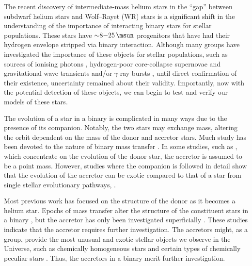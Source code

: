 The recent discovery of intermediate-mass helium stars in the ``gap'' between subdwarf helium stars and Wolf--Rayet (WR) stars \citep{Drout:2023, Gotberg:2023} is a significant shift in the understanding of the importance of interacting binary stars for stellar populations. These stars have ${\sim}\SI[parse-numbers=false]{8{-}25}{\msun}$ progenitors that have had their hydrogen envelope stripped via binary interaction. Although many groups have investigated the importance of these objects for stellar populations, such as sources of ionising photons \citep[e.g.][]{Stanway:2016, Gotberg:2017, Xiao:2018}, hydrogen-poor core-collapse supernovae \citep[e.g.][]{deDonder:1998, Smith:2011, Eldridge:2013, Eldridge:2016, Laplace:2021} and gravitational wave transients and/or $\gamma$-ray bursts \citep[e.g.][]{Eldridge:2011, Qin:2018, Bavera:2020, Fuller:2022, Stevance:2023}, until direct confirmation of their existence, uncertainty remained about their validity. Importantly, now with the potential detection of these objects, we can begin to test and verify our models of these stars.

The evolution of a star in a binary is complicated in many ways due to the presence of its companion. Notably, the two stars may exchange mass, altering the orbit dependent on the mass of the donor and accretor stars. Much study has been devoted to the nature of binary mass transfer \citep[among others,][]{Delgado:1981, Soberman:1997, Davis:2013, Landri:2024}. In some studies, such as \citet{Dutta:2023}, which concentrate on the evolution of the donor star, the accretor is assumed to be a point mass. However, studies where the companion is followed in detail show that the evolution of the accretor can be exotic compared to that of a star from single stellar evolutionary pathways, \citep[e.g.][]{Wellstein:2001, Renzo:2021, Renzo:2023, Menon:2024, Schneider:2024, Wagg:2024}.

Most previous work has focused on the structure of the donor as it becomes a helium star. Epochs of mass transfer alter the structure of the constituent stars in a binary \citep{Law-Smith:2020, Klencki:2021, Renzo:2021}, but the accretor has only been investigated superficially \citep[e.g.,][]{Packet:1981, Cantiello:2007, deMink:2013, Renzo:2021}. These studies indicate that the accretor requires further investigation. The accretors might, as a group, provide the most unusual and exotic stellar objects we observe in the Universe, such as chemically homogeneous stars \citep{deMink:2013, Ghodla:2023} and certain types of chemically peculiar stars \citep[e.g.,][]{Hunter:2008, Langer:2012}.  Thus, the accretors in a binary merit further investigation.

